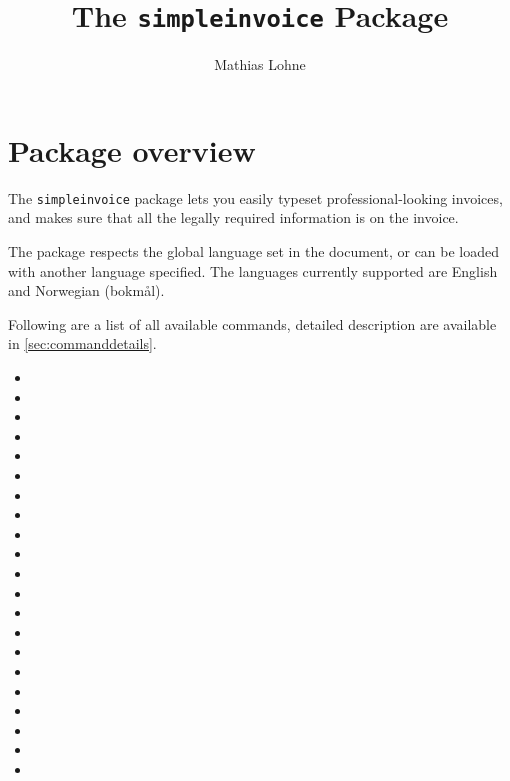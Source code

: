 \documentclass[a4paper, article, oneside, USenglish, hidelinks]{memoir}
\title{The \texttt{simpleinvoice} Package}
\author{Mathias Lohne}
\date{}
\begin{document}
\maketitle

\tableofcontents

\newpage
\chapter{Package overview}
The \texttt{simpleinvoice} package lets you easily typeset professional-looking invoices, and makes sure that all the legally required information is on the invoice.

The package respects the global language set in the document, or can be loaded with another language specified. The languages currently supported are English and Norwegian (bokmål).


Following are a list of all available commands, detailed description are available in \cref{sec:commanddetails}.

\begin{itemize}
	\item {}
	\item {}
	\item {}
	\item {}
	\item {}
	\item {}
	\item {}
	\item {}
	\item {}
	\item {}
	\item {}
	\item {}
	\item {}
	\item {}
	\item {}
	\item {}
	\item {}
	\item {}
	\item {}
	\item {}
	\item {}
\end{itemize}
\end{document}
